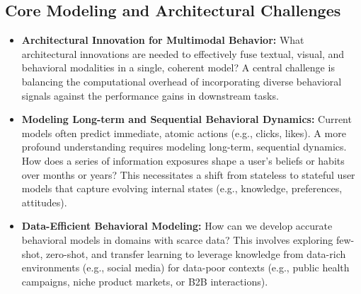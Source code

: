 \subsection*{Core Modeling and Architectural Challenges}
\begin{itemize}
    \item \textbf{Architectural Innovation for Multimodal Behavior:} What architectural innovations are needed to effectively fuse textual, visual, and behavioral modalities in a single, coherent model? A central challenge is balancing the computational overhead of incorporating diverse behavioral signals against the performance gains in downstream tasks.
    
    \item \textbf{Modeling Long-term and Sequential Behavioral Dynamics:} Current models often predict immediate, atomic actions (e.g., clicks, likes). A more profound understanding requires modeling long-term, sequential dynamics. How does a series of information exposures shape a user's beliefs or habits over months or years? This necessitates a shift from stateless to stateful user models that capture evolving internal states (e.g., knowledge, preferences, attitudes).

    \item \textbf{Data-Efficient Behavioral Modeling:} How can we develop accurate behavioral models in domains with scarce data? This involves exploring few-shot, zero-shot, and transfer learning to leverage knowledge from data-rich environments (e.g., social media) for data-poor contexts (e.g., public health campaigns, niche product markets, or B2B interactions).
\end{itemize}

